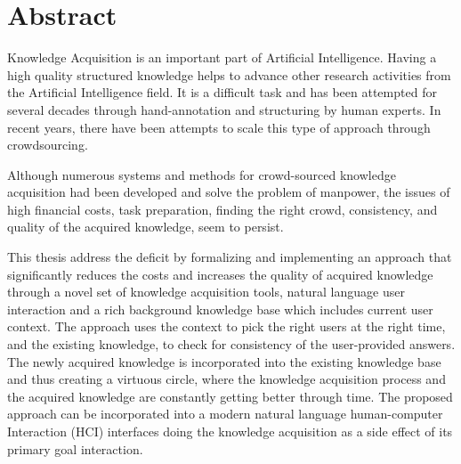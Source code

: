 % 
\chapter*{Abstract}




Knowledge Acquisition is an important part of Artificial Intelligence. Having 
a high quality structured knowledge helps to advance other research activities from the Artificial Intelligence field. It is a difficult task and has been attempted for several decades through hand-annotation and structuring by human experts. In recent years, there have been attempts to scale this type of approach through crowdsourcing. 

Although numerous systems and methods for crowd-sourced knowledge acquisition had been developed and solve the problem of manpower, the issues of high financial costs, task preparation, finding the right crowd, consistency, and quality of the acquired knowledge, seem to persist. 

This thesis address the deficit by formalizing and implementing an approach
that significantly reduces the costs and increases the quality of acquired knowledge through a novel set of knowledge acquisition tools, natural language user interaction and a rich background knowledge base which includes current user context. The approach uses the context to pick the right users at the right time, and the existing knowledge, to check for consistency of the user-provided answers. The newly acquired knowledge is incorporated into the
existing knowledge base and thus creating a virtuous circle, where the knowledge acquisition
process and the acquired knowledge are constantly getting better through time.
The proposed approach can be incorporated into a modern natural language
human-computer Interaction (HCI) interfaces doing the knowledge acquisition as
a side effect of its primary goal interaction. 

